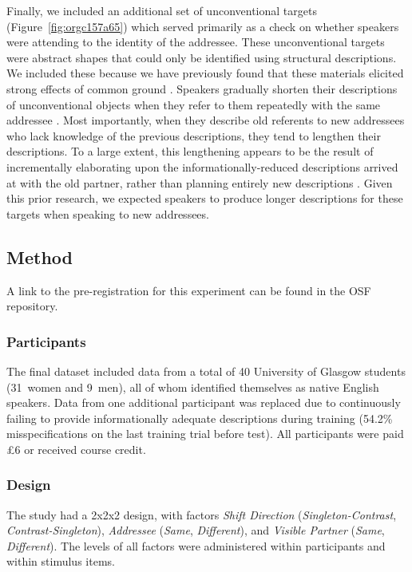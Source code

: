 \documentclass[natbib,doc,a4paper]{apa6}
\begin{document}
Finally, we included an additional set of unconventional targets (Figure~\ref{fig:orgc157a65}) which served primarily as a check on whether speakers were attending to the identity of the addressee. These unconventional targets were abstract shapes that could only be identified using structural descriptions. We included these because we have previously found that these materials elicited strong effects of common ground \citep{GannBarr2014}. Speakers gradually shorten their descriptions of unconventional objects when they refer to them repeatedly with the same addressee \citep{clarkwilkesgibbs86}. Most importantly, when they describe old referents to new addressees who lack knowledge of the previous descriptions, they tend to lengthen their descriptions. To a large extent, this lengthening appears to be the result of incrementally elaborating upon the informationally-reduced descriptions arrived at with the old partner, rather than planning entirely new descriptions \citep{GannBarr2014}. Given this prior research, we expected speakers to produce longer descriptions for these targets when speaking to new addressees.

\subsection*{Method}
\label{sec:org7c5f5e9}

A link to the pre-registration for this experiment can be found in the OSF repository.

\subsubsection*{Participants}
\label{sec:org06e10ce}

The final dataset included data from a total of 40 University of Glasgow students (31~women and 9~men), all of whom identified themselves as native English speakers. Data from one additional participant was replaced due to continuously failing to provide informationally adequate descriptions during training (54.2\% misspecifications on the last training trial before test). All participants were paid £6 or received course credit.

\subsubsection*{Design}
\label{sec:org66f1441}

The study had a 2x2x2 design, with factors \emph{Shift Direction} (\emph{Singleton-Contrast}, \emph{Contrast-Singleton}), \emph{Addressee} (\emph{Same}, \emph{Different}), and \emph{Visible Partner} (\emph{Same}, \emph{Different}). The levels of all factors were administered within participants and within stimulus items.
\end{document}
